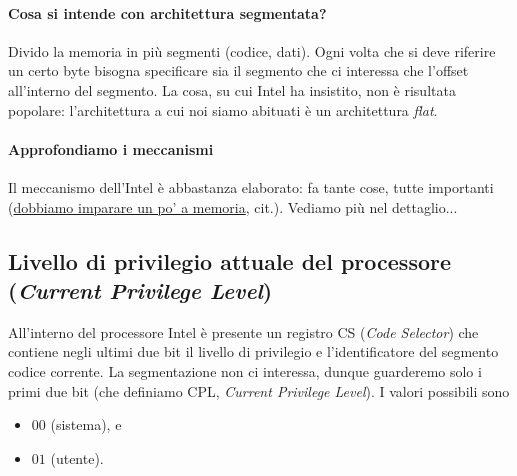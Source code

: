 \paragraph{Cosa si intende con architettura segmentata?} Divido la memoria in più segmenti (codice, dati). Ogni volta che si deve riferire un certo byte bisogna specificare sia il segmento che ci interessa che l'offset all'interno del segmento. La cosa, su cui Intel ha insistito, non è risultata popolare: l'architettura a cui noi siamo abituati è un architettura \emph{flat}.


\paragraph{Approfondiamo i meccanismi} Il meccanismo dell'Intel è abbastanza elaborato: fa tante cose, tutte importanti (\underline{dobbiamo imparare un po' a memoria}, cit.). Vediamo più nel dettaglio...
\subsection{Livello di privilegio attuale del processore (\emph{Current Privilege Level})} 
All'interno del processore Intel è presente un registro CS (\emph{Code Selector}) che contiene negli ultimi due bit il livello di privilegio e l'identificatore del segmento codice corrente. La segmentazione non ci interessa, dunque guarderemo solo i primi due bit (che definiamo CPL, \emph{Current Privilege Level}). I valori possibili sono 
\begin{multicols}{2}
	\begin{itemize}
		\item $00$ (sistema), e
		\item  $01$ (utente).
	\end{itemize}
\end{multicols}
